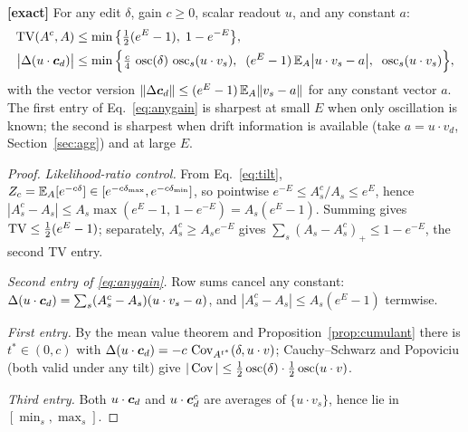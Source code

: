 \documentclass{article}
\begin{document}
\begin{prop}\label{prop:anygain}
\textbf{[exact]} For any edit $\delta$, gain $c \ge 0$, scalar readout $u$, and any constant $a$:
\begin{align}
    \operatorname{TV}(A^c, A) &\le \min\big\{\tfrac12(e^{E}-1),\; 1 - e^{-E}\big\}, \label{eq:tv}\\
    \big|\Delta(u\cdot\boldsymbol{c}_d)\big| &\le \min\Big\{\tfrac{c}{4}\,\operatorname{osc}(\delta)\,\operatorname{osc}_s(u\cdot v_s),\;\;
    (e^{E}-1)\,\mathbb{E}_A\big|u\cdot v_s - a\big|,\;\;
    \operatorname{osc}_s(u\cdot v_s)\Big\}, \label{eq:anygain}
\end{align}
with the vector version $\|\Delta\boldsymbol{c}_d\| \le (e^E - 1)\,\mathbb{E}_A\|v_s - a\|$ for any constant vector $a$. The first entry of Eq.~\eqref{eq:anygain} is sharpest at small $E$ when only oscillation is known; the second is sharpest when drift information is available (take $a = u\cdot v_d$, Section~\ref{sec:agg}) and at large $E$.
\end{prop}
\begin{proof}
\emph{Likelihood-ratio control.} From Eq.~\eqref{eq:tilt}, $Z_c = \mathbb{E}_A[e^{-c\delta}] \in [e^{-c\delta_{\max}}, e^{-c\delta_{\min}}]$, so pointwise $e^{-E} \le A^c_s/A_s \le e^{E}$, hence $|A^c_s - A_s| \le A_s\max(e^E - 1,\, 1 - e^{-E}) = A_s(e^E - 1)$. Summing gives $\operatorname{TV} \le \tfrac12(e^E - 1)$; separately, $A^c_s \ge A_s e^{-E}$ gives $\sum_s (A_s - A^c_s)_+ \le 1 - e^{-E}$, the second TV entry.

\emph{Second entry of \eqref{eq:anygain}.} Row sums cancel any constant: $\Delta(u\cdot\boldsymbol{c}_d) = \sum_s (A^c_s - A_s)(u\cdot v_s - a)$, and $|A^c_s - A_s| \le A_s(e^E - 1)$ termwise.

\emph{First entry.} By the mean value theorem and Proposition~\ref{prop:cumulant} there is $t^* \in (0,c)$ with $\Delta(u\cdot\boldsymbol{c}_d) = -c\,\operatorname{Cov}_{A^{t^*}}(\delta, u\cdot v)$; Cauchy--Schwarz and Popoviciu (both valid under any tilt) give $|\operatorname{Cov}| \le \tfrac12\operatorname{osc}(\delta)\cdot\tfrac12\operatorname{osc}(u\cdot v)$.

\emph{Third entry.} Both $u\cdot\boldsymbol{c}_d$ and $u\cdot\boldsymbol{c}_d^c$ are averages of $\{u\cdot v_s\}$, hence lie in $[\min_s, \max_s]$.
\end{proof}
\end{document}
